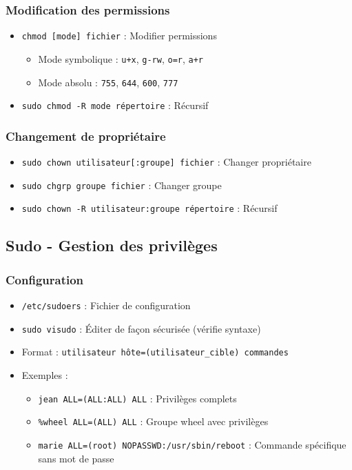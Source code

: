 \documentclass[12pt,a4paper]{article}
\begin{document}
\subsubsection{Modification des permissions}
\begin{itemize}
    \item \texttt{chmod [mode] fichier} : Modifier permissions
    \begin{itemize}
        \item Mode symbolique : \texttt{u+x}, \texttt{g-rw}, \texttt{o=r}, \texttt{a+r}
        \item Mode absolu : \texttt{755}, \texttt{644}, \texttt{600}, \texttt{777}
    \end{itemize}
    \item \texttt{sudo chmod -R mode répertoire} : Récursif
\end{itemize}

\subsubsection{Changement de propriétaire}
\begin{itemize}
    \item \texttt{sudo chown utilisateur[:groupe] fichier} : Changer propriétaire
    \item \texttt{sudo chgrp groupe fichier} : Changer groupe
    \item \texttt{sudo chown -R utilisateur:groupe répertoire} : Récursif
\end{itemize}

\subsection{Sudo - Gestion des privilèges}

\subsubsection{Configuration}
\begin{itemize}
    \item \texttt{/etc/sudoers} : Fichier de configuration
    \item \texttt{sudo visudo} : Éditer de façon sécurisée (vérifie syntaxe)
    \item Format : \texttt{utilisateur hôte=(utilisateur\_cible) commandes}
    \item Exemples :
    \begin{itemize}
        \item \texttt{jean ALL=(ALL:ALL) ALL} : Privilèges complets
        \item \texttt{\%wheel ALL=(ALL) ALL} : Groupe wheel avec privilèges
        \item \texttt{marie ALL=(root) NOPASSWD:/usr/sbin/reboot} : Commande spécifique sans mot de passe
    \end{itemize}
\end{itemize}
\end{document}
